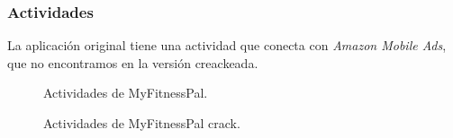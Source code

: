 \documentclass[12pt,twoside]{article}
\begin{document}
\subsubsection{Actividades}
La aplicación  original tiene una actividad que conecta con \textit{Amazon Mobile Ads}, que no encontramos en la versión creackeada.
\begin{figure}[H]
    \centering
    \caption{Actividades de MyFitnessPal.}
\end{figure}
\begin{figure}[H]
    \centering
    \caption{Actividades de MyFitnessPal crack.}
\end{figure}
\end{document}
